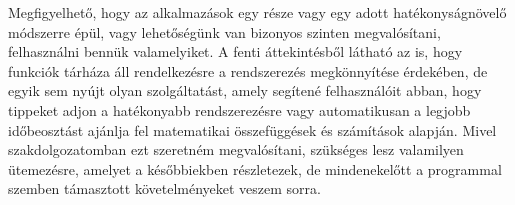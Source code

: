 Megfigyelhető, hogy az alkalmazások egy része vagy egy adott hatékonyságnövelő módszerre épül, vagy lehetőségünk van bizonyos szinten megvalósítani, felhasználni bennük valamelyiket. A fenti áttekintésből látható az is, hogy funkciók tárháza áll rendelkezésre a rendszerezés megkönnyítése érdekében, de egyik sem nyújt olyan szolgáltatást, amely segítené felhasználóit abban, hogy tippeket adjon a hatékonyabb rendszerezésre vagy automatikusan a legjobb időbeosztást ajánlja fel matematikai összefüggések és számítások alapján. Mivel szakdolgozatomban ezt szeretném megvalósítani, szükséges lesz valamilyen ütemezésre, amelyet a későbbiekben részletezek, de mindenekelőtt a programmal szemben támasztott követelményeket veszem sorra.
